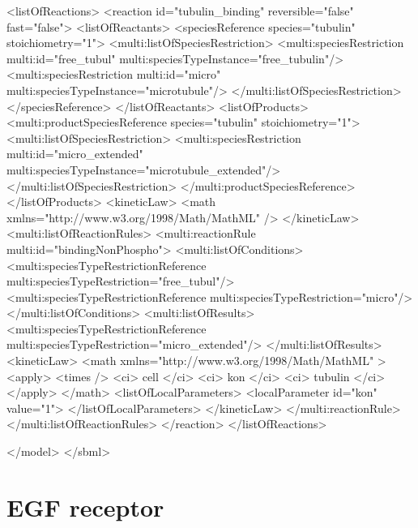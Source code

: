 \begin{example}
    <listOfReactions>
      <reaction id="tubulin_binding" reversible="false" fast="false"> 
        <listOfReactants>
          <speciesReference species="tubulin" stoichiometry="1">
            <multi:listOfSpeciesRestriction>
              <multi:speciesRestriction multi:id="free_tubul"
                                        multi:speciesTypeInstance="free_tubulin"/>
              <multi:speciesRestriction multi:id="micro" 
                                        multi:speciesTypeInstance="microtubule"/>
            </multi:listOfSpeciesRestriction>
          </speciesReference>
        </listOfReactants>
        <listOfProducts>
          <multi:productSpeciesReference species="tubulin" stoichiometry="1">
            <multi:listOfSpeciesRestriction>
              <multi:speciesRestriction multi:id="micro_extended"
                                   multi:speciesTypeInstance="microtubule_extended"/>
            </multi:listOfSpeciesRestriction>
          </multi:productSpeciesReference>
        </listOfProducts>
        <kineticLaw>
          <math xmlns="http://www.w3.org/1998/Math/MathML" />
        </kineticLaw>
        <multi:listOfReactionRules>
          <multi:reactionRule multi:id="bindingNonPhospho">
            <multi:listOfConditions>
              <multi:speciesTypeRestrictionReference multi:speciesTypeRestriction="free_tubul"/>
              <multi:speciesTypeRestrictionReference multi:speciesTypeRestriction="micro"/>
            </multi:listOfConditions>
            <multi:listOfResults>
              <multi:speciesTypeRestrictionReference
                                      multi:speciesTypeRestriction="micro_extended"/>
            </multi:listOfResults>
            <kineticLaw>
              <math xmlns="http://www.w3.org/1998/Math/MathML" >
                <apply>
                  <times />
                  <ci> cell </ci>
                  <ci> kon </ci>
                  <ci> tubulin </ci>
                </apply>
              </math>
              <listOfLocalParameters>
                <localParameter id="kon" value="1">
              </listOfLocalParameters>
            </kineticLaw>
          </multi:reactionRule>
        </multi:listOfReactionRules>
      </reaction>
    </listOfReactions>

  </model>
</sbml>
\end{example}

\section{EGF receptor}

